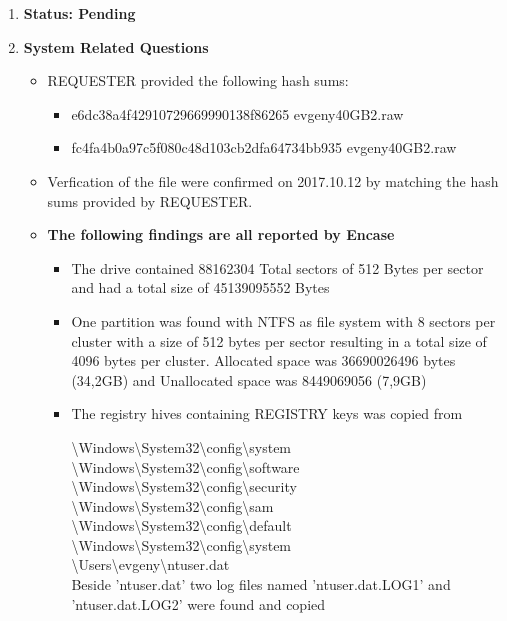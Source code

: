 \begin{enumerate}
\item \textbf{Status: Pending}\\
\item \textbf{System Related Questions}
	\begin{itemize}
	\item REQUESTER provided the following hash sums:
		\begin{itemize}
			\item e6dc38a4f42910729669990138f86265  evgeny\textunderscore 40GB\textunderscore2.raw
			\item fc4fa4b0a97c5f080c48d103cb2dfa64734bb935 evgeny\textunderscore 40GB\textunderscore2.raw
		\end{itemize}
	\item Verfication of the file were confirmed on 2017.10.12 by matching the hash sums provided by REQUESTER.
	\item \textbf{The following findings are all reported by Encase}
		\begin{itemize}
		\item The drive contained 88162304 Total sectors of 512 Bytes per sector 
			and had a total size of 45139095552 Bytes
		\item One partition was found with NTFS as file system with 8 sectors per cluster with a size
			of 512 bytes per sector resulting in a total size of 4096 bytes per cluster.
			Allocated space was 36690026496 bytes (34,2GB) and Unallocated space
			was 8449069056 (7,9GB)
		\item The registry hives containing REGISTRY keys was copied from 
			\begin{itemize}
			\textbackslash Windows\textbackslash System32\textbackslash config\textbackslash system\\ 
			\textbackslash Windows\textbackslash System32\textbackslash config\textbackslash software\\
			\textbackslash Windows\textbackslash System32\textbackslash config\textbackslash security\\
			\textbackslash Windows\textbackslash System32\textbackslash config\textbackslash sam \\
			\textbackslash Windows\textbackslash System32\textbackslash config\textbackslash default \\
			\textbackslash Windows\textbackslash System32\textbackslash config\textbackslash system \\
			\textbackslash Users\textbackslash evgeny\textbackslash ntuser.dat \\
			Beside 'ntuser.dat' two log files named 'ntuser.dat.LOG1' and 'ntuser.dat.LOG2' were found and copied
	\end{itemize}
	

\end{itemize}
\end{itemize}
\end{enumerate}
